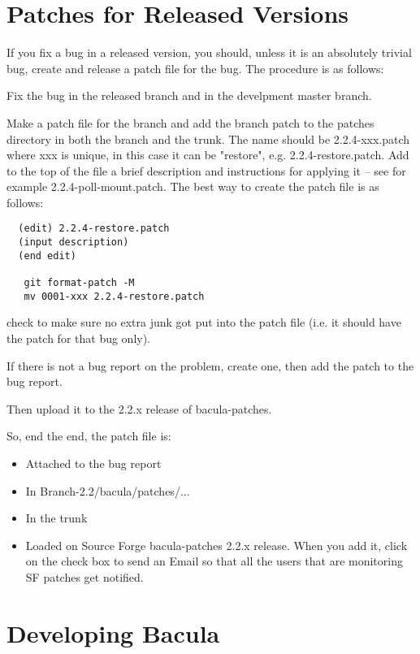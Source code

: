 \section{Patches for Released Versions}
If you fix a bug in a released version, you should, unless it is
an absolutely trivial bug, create and release a patch file for the
bug.  The procedure is as follows:

Fix the bug in the released branch and in the develpment master branch.

Make a patch file for the branch and add the branch patch to
the patches directory in both the branch and the trunk.
The name should be 2.2.4-xxx.patch  where xxx is unique, in this case it can
be "restore", e.g. 2.2.4-restore.patch.  Add to the top of the
file  a brief description and instructions for applying it -- see for example
2.2.4-poll-mount.patch.  The best way to create the patch file is as
follows:

\begin{verbatim}
  (edit) 2.2.4-restore.patch
  (input description)
  (end edit)

   git format-patch -M
   mv 0001-xxx 2.2.4-restore.patch
\end{verbatim}

check to make sure no extra junk got put into the patch file (i.e.
it should have the patch for that bug only).

If there is not a bug report on the problem, create one, then add the
patch to the bug report.

Then upload it to the 2.2.x release of bacula-patches.

So, end the end, the patch file is:
\begin{itemize}
\item Attached to the bug report

\item In Branch-2.2/bacula/patches/...

\item In the trunk

\item Loaded on Source Forge bacula-patches 2.2.x release. When
   you add it, click on the check box to send an Email so that all the
   users that are monitoring SF patches get notified.
\end{itemize}


\section{Developing Bacula}

